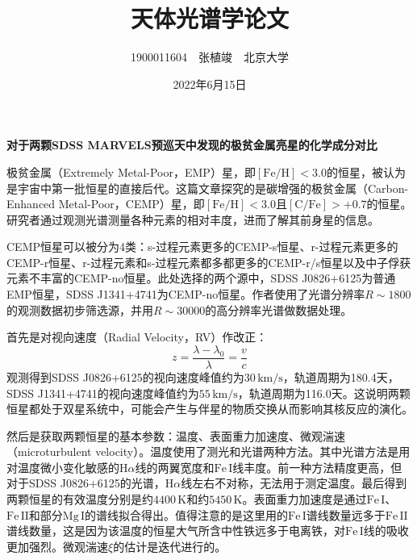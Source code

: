 \documentclass[a4paper]{article}
\begin{document}
\title{\textbf{天体光谱学论文}}
\author{1900011604\ \ 张植竣\ \ 北京大学}
\date{2022年6月15日}
\maketitle

\begin{center}
    \large\textbf{对于两颗SDSS MARVELS预巡天中发现的极贫金属亮星的化学成分对比}
\end{center}

极贫金属（Extremely Metal-Poor，EMP）星，即$[\mathrm{Fe/H}]<3.0$的恒星，被认为是宇宙中第一批恒星的直接后代。这篇文章探究的是碳增强的极贫金属（Carbon-Enhanced Metal-Poor，CEMP）星，即$[\mathrm{Fe/H}]<3.0$且$[\mathrm{C/Fe}]>+0.7$的恒星。研究者通过观测光谱测量各种元素的相对丰度，进而了解其前身星的信息。

CEMP恒星可以被分为4类：s-过程元素更多的CEMP-s恒星、r-过程元素更多的CEMP-r恒星、r-过程元素和s-过程元素都多都更多的CEMP-r/s恒星以及中子俘获元素不丰富的CEMP-no恒星。此处选择的两个源中，SDSS J0826+6125为普通EMP恒星，SDSS J1341+4741为CEMP-no恒星。作者使用了光谱分辨率$R\sim1800$的观测数据初步筛选源，并用$R\sim30000$的高分辨率光谱做数据处理。

首先是对视向速度（Radial Velocity，RV）作改正：
\[
    z = \frac{\lambda - \lambda_0}{\lambda} = \frac{v}{c}
\]
观测得到SDSS J0826+6125的视向速度峰值约为$30\,\mathrm{km/s}$，轨道周期为180.4天，SDSS J1341+4741的视向速度峰值约为$55\,\mathrm{km/s}$，轨道周期为116.0天。这说明两颗恒星都处于双星系统中，可能会产生与伴星的物质交换从而影响其核反应的演化。

然后是获取两颗恒星的基本参数：温度、表面重力加速度、微观湍速（microturbulent velocity）。温度使用了测光和光谱两种方法。其中光谱方法是用对温度微小变化敏感的$\mathrm{H}\alpha$线的两翼宽度和$\mathrm{Fe\,I}$线丰度。前一种方法精度更高，但对于SDSS J0826+6125的光谱，$\mathrm{H}\alpha$线左右不对称，无法用于测定温度。最后得到两颗恒星的有效温度分别是约$4400\,\mathrm{K}$和约$5450\,\mathrm{K}$。表面重力加速度是通过$\mathrm{Fe\,I}$、$\mathrm{Fe\,II}$和部分$\mathrm{Mg\,I}$的谱线拟合得出。值得注意的是这里用的$\mathrm{Fe\,I}$谱线数量远多于$\mathrm{Fe\,II}$谱线数量，这是因为该温度的恒星大气所含中性铁远多于电离铁，对$\mathrm{Fe\,I}$线的吸收更加强烈。微观湍速$\xi$的估计是迭代进行的。
\end{document}
